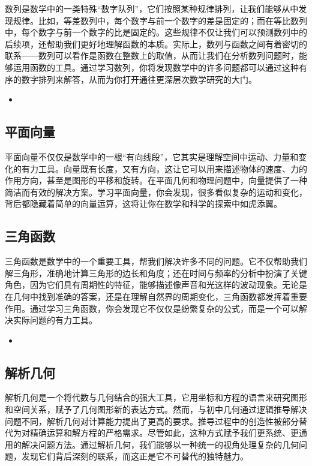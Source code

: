 数列是数学中的一类特殊“数字队列”，它们按照某种规律排列，让我们能够从中发现规律。比如，等差数列中，每个数字与前一个数字的差是固定的；而在等比数列中，每个数字与前一个数字的比是固定的。这些规律不仅让我们可以预测数列中的后续项，还帮助我们更好地理解函数的本质。实际上，数列与函数之间有着密切的联系——数列可以看作是函数在整数上的取值，从而让我们在分析数列问题时，能够运用函数的工具。通过学习数列，你将发现数学中的许多问题都可以通过这种有序的数字排列来解答，从而为你打开通往更深层次数学研究的大门。

\begin{itemize}
\item {}
\end{itemize}
\subsection{平面向量}

平面向量不仅仅是数学中的一根“有向线段”，它其实是理解空间中运动、力量和变化的有力工具。向量既有长度，又有方向，这让它可以用来描述物体的速度、力的作用方向，甚至是图形的平移和旋转。在平面几何和物理问题中，向量提供了一种简洁而有效的解决方案。学习平面向量，你会发现，很多看似复杂的运动和变化，背后都隐藏着简单的向量运算，这将让你在数学和科学的探索中如虎添翼。


\subsection{三角函数}

三角函数是数学中的一个重要工具，帮我们解决许多不同的问题。它不仅帮助我们解三角形，准确地计算三角形的边长和角度；还在时间与频率的分析中扮演了关键角色，因为它们具有周期性的特征，能够描述像声音和光这样的波动现象。无论是在几何中找到准确的答案，还是在理解自然界的周期变化，三角函数都发挥着重要作用。通过学习三角函数，你会发现它不仅仅是纷繁复杂的公式，而是一个可以解决实际问题的有力工具。

\begin{itemize}
\item {}
\end{itemize}
\subsection{解析几何}

解析几何是一个将代数与几何结合的强大工具，它用坐标和方程的语言来研究图形和空间关系，赋予了几何图形新的表达方式。然而，与初中几何通过逻辑推导解决问题不同，解析几何对计算能力提出了更高的要求。推导过程中的创造性被部分替代为对精确运算和解方程的严格需求。尽管如此，这种方式赋予我们更系统、更通用的解决问题方法。通过解析几何，我们能够以一种统一的视角处理复杂的几何问题，发现它们背后深刻的联系，而这正是它不可替代的独特魅力。


